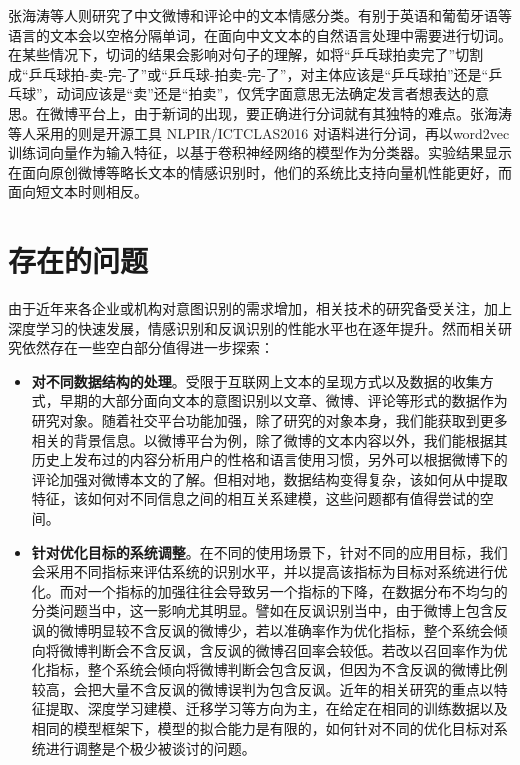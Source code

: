 张海涛等人\cite{zhang2018jiyu}则研究了中文微博和评论中的文本情感分类。有别于英语和葡萄牙语等语言的文本会以空格分隔单词，在面向中文文本的自然语言处理中需要进行切词。在某些情况下，切词的结果会影响对句子的理解，如将“乒乓球拍卖完了”切割成“乒乓球拍-卖-完-了”或“乒乓球-拍卖-完-了”，对主体应该是“乒乓球拍”还是“乒乓球”，动词应该是“卖”还是“拍卖”，仅凭字面意思无法确定发言者想表达的意思。在微博平台上，由于新词的出现，要正确进行分词就有其独特的难点。张海涛等人采用的则是开源工具 NLPIR/ICTCLAS2016 对语料进行分词，再以word2vec训练词向量作为输入特征，以基于卷积神经网络的模型作为分类器。实验结果显示在面向原创微博等略长文本的情感识别时，他们的系统比支持向量机性能更好，而面向短文本时则相反。

\section{存在的问题}

由于近年来各企业或机构对意图识别的需求增加，相关技术的研究备受关注，加上深度学习的快速发展，情感识别和反讽识别的性能水平也在逐年提升。然而相关研究依然存在一些空白部分值得进一步探索：

\begin{itemize}

\item {\bf 对不同数据结构的处理}。受限于互联网上文本的呈现方式以及数据的收集方式，早期的大部分面向文本的意图识别以文章、微博、评论等形式的数据作为研究对象。随着社交平台功能加强，除了研究的对象本身，我们能获取到更多相关的背景信息。以微博平台为例，除了微博的文本内容以外，我们能根据其历史上发布过的内容分析用户的性格和语言使用习惯，另外可以根据微博下的评论加强对微博本文的了解。但相对地，数据结构变得复杂，该如何从中提取特征，该如何对不同信息之间的相互关系建模，这些问题都有值得尝试的空间。

\item {\bf 针对优化目标的系统调整}。在不同的使用场景下，针对不同的应用目标，我们会采用不同指标来评估系统的识别水平，并以提高该指标为目标对系统进行优化。而对一个指标的加强往往会导致另一个指标的下降，在数据分布不均匀的分类问题当中，这一影响尤其明显。譬如在反讽识别当中，由于微博上包含反讽的微博明显较不含反讽的微博少，若以准确率作为优化指标，整个系统会倾向将微博判断会不含反讽，含反讽的微博召回率会较低。若改以召回率作为优化指标，整个系统会倾向将微博判断会包含反讽，但因为不含反讽的微博比例较高，会把大量不含反讽的微博误判为包含反讽。近年的相关研究的重点以特征提取、深度学习建模、迁移学习等方向为主，在给定在相同的训练数据以及相同的模型框架下，模型的拟合能力是有限的，如何针对不同的优化目标对系统进行调整是个极少被谈讨的问题。

\end{itemize}

